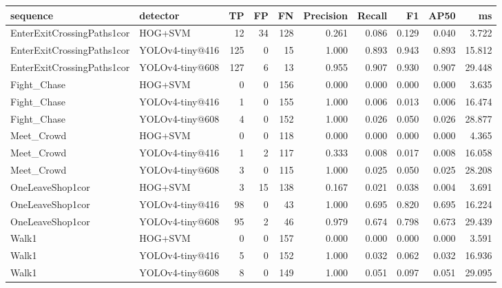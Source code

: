 \begin{tabular}{llrrrrrrrr}
\toprule
sequence & detector & TP & FP & FN & Precision & Recall & F1 & AP50 & ms \\
\midrule
EnterExitCrossingPaths1cor & HOG+SVM & 12 & 34 & 128 & 0.261 & 0.086 & 0.129 & 0.040 & 3.722 \\
EnterExitCrossingPaths1cor & YOLOv4-tiny@416 & 125 & 0 & 15 & 1.000 & 0.893 & 0.943 & 0.893 & 15.812 \\
EnterExitCrossingPaths1cor & YOLOv4-tiny@608 & 127 & 6 & 13 & 0.955 & 0.907 & 0.930 & 0.907 & 29.448 \\
Fight_Chase & HOG+SVM & 0 & 0 & 156 & 0.000 & 0.000 & 0.000 & 0.000 & 3.635 \\
Fight_Chase & YOLOv4-tiny@416 & 1 & 0 & 155 & 1.000 & 0.006 & 0.013 & 0.006 & 16.474 \\
Fight_Chase & YOLOv4-tiny@608 & 4 & 0 & 152 & 1.000 & 0.026 & 0.050 & 0.026 & 28.877 \\
Meet_Crowd & HOG+SVM & 0 & 0 & 118 & 0.000 & 0.000 & 0.000 & 0.000 & 4.365 \\
Meet_Crowd & YOLOv4-tiny@416 & 1 & 2 & 117 & 0.333 & 0.008 & 0.017 & 0.008 & 16.058 \\
Meet_Crowd & YOLOv4-tiny@608 & 3 & 0 & 115 & 1.000 & 0.025 & 0.050 & 0.025 & 28.208 \\
OneLeaveShop1cor & HOG+SVM & 3 & 15 & 138 & 0.167 & 0.021 & 0.038 & 0.004 & 3.691 \\
OneLeaveShop1cor & YOLOv4-tiny@416 & 98 & 0 & 43 & 1.000 & 0.695 & 0.820 & 0.695 & 16.224 \\
OneLeaveShop1cor & YOLOv4-tiny@608 & 95 & 2 & 46 & 0.979 & 0.674 & 0.798 & 0.673 & 29.439 \\
Walk1 & HOG+SVM & 0 & 0 & 157 & 0.000 & 0.000 & 0.000 & 0.000 & 3.591 \\
Walk1 & YOLOv4-tiny@416 & 5 & 0 & 152 & 1.000 & 0.032 & 0.062 & 0.032 & 16.936 \\
Walk1 & YOLOv4-tiny@608 & 8 & 0 & 149 & 1.000 & 0.051 & 0.097 & 0.051 & 29.095 \\
\bottomrule
\end{tabular}
